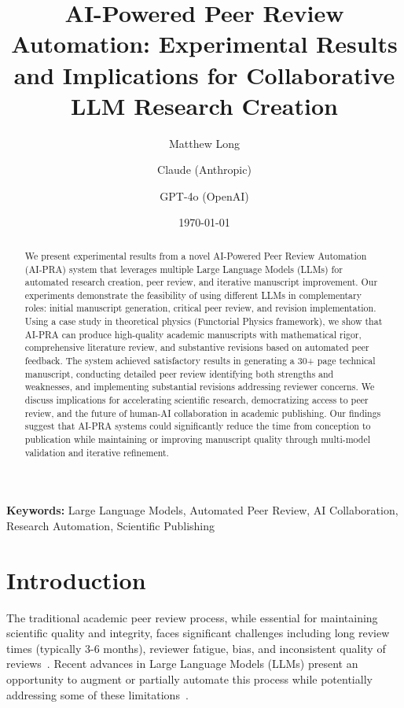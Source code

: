 \documentclass[11pt,a4paper]{article}
\title{AI-Powered Peer Review Automation: Experimental Results and Implications for Collaborative LLM Research Creation}
\author[1]{Matthew Long}
\author[2]{Claude (Anthropic)}
\author[3]{GPT-4o (OpenAI)}
\affil[1]{Magneton Labs, Yoneda AI}
\affil[2]{AI Research Assistant, Anthropic}
\affil[3]{AI Research Assistant, OpenAI}
\date{\today}
\begin{document}
\maketitle

\begin{abstract}
We present experimental results from a novel AI-Powered Peer Review Automation (AI-PRA) system that leverages multiple Large Language Models (LLMs) for automated research creation, peer review, and iterative manuscript improvement. Our experiments demonstrate the feasibility of using different LLMs in complementary roles: initial manuscript generation, critical peer review, and revision implementation. Using a case study in theoretical physics (Functorial Physics framework), we show that AI-PRA can produce high-quality academic manuscripts with mathematical rigor, comprehensive literature review, and substantive revisions based on automated peer feedback. The system achieved satisfactory results in generating a 30+ page technical manuscript, conducting detailed peer review identifying both strengths and weaknesses, and implementing substantial revisions addressing reviewer concerns. We discuss implications for accelerating scientific research, democratizing access to peer review, and the future of human-AI collaboration in academic publishing. Our findings suggest that AI-PRA systems could significantly reduce the time from conception to publication while maintaining or improving manuscript quality through multi-model validation and iterative refinement.
\end{abstract}

\textbf{Keywords:} Large Language Models, Automated Peer Review, AI Collaboration, Research Automation, Scientific Publishing

\tableofcontents

\section{Introduction}

The traditional academic peer review process, while essential for maintaining scientific quality and integrity, faces significant challenges including long review times (typically 3-6 months), reviewer fatigue, bias, and inconsistent quality of reviews~\cite{bjork2013publishing,lee2013bias}. Recent advances in Large Language Models (LLMs) present an opportunity to augment or partially automate this process while potentially addressing some of these limitations~\cite{wang2023large,heaven2023ai}.
\end{document}
